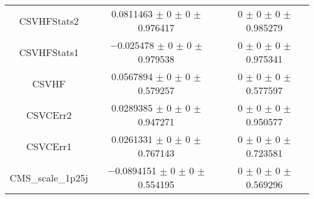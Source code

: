 \begin{table}
\begin{tabular}{ccc}
CSVHFStats2 	& \num{0.0811463} $\pm$ \num{0} $\pm$ \num{0} $\pm$ \num{0.976417} 	& \num{0} $\pm$ \num{0} $\pm$ \num{0} $\pm$ \num{0.985279}\\
CSVHFStats1 	& \num{-0.025478} $\pm$ \num{0} $\pm$ \num{0} $\pm$ \num{0.979538} 	& \num{0} $\pm$ \num{0} $\pm$ \num{0} $\pm$ \num{0.975341}\\
CSVHF 	& \num{0.0567894} $\pm$ \num{0} $\pm$ \num{0} $\pm$ \num{0.579257} 	& \num{0} $\pm$ \num{0} $\pm$ \num{0} $\pm$ \num{0.577597}\\
CSVCErr2 	& \num{0.0289385} $\pm$ \num{0} $\pm$ \num{0} $\pm$ \num{0.947271} 	& \num{0} $\pm$ \num{0} $\pm$ \num{0} $\pm$ \num{0.950577}\\
CSVCErr1 	& \num{0.0261331} $\pm$ \num{0} $\pm$ \num{0} $\pm$ \num{0.767143} 	& \num{0} $\pm$ \num{0} $\pm$ \num{0} $\pm$ \num{0.723581}\\
CMS\_scale\_1p25j 	& \num{-0.0894151} $\pm$ \num{0} $\pm$ \num{0} $\pm$ \num{0.554195} 	& \num{0} $\pm$ \num{0} $\pm$ \num{0} $\pm$ \num{0.569296}\\
\bottomrule
\end{tabular}
\end{table}